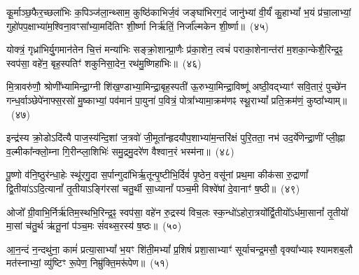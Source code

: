 {\anuvakamend[{वाजं॒ पञ्च॑विꣳशतिः}]}%

कू॒र्माञ्छ॒फैर॒च्छला॑भिः क॒पिञ्ज॑ला॒न्थ्साम॒ कुष्ठि॑काभिर्ज॒वं जङ्घा॑भिरग॒दं जानु॑भ्यां वी॒र्यं॑ कु॒हा\-भ्यां᳚ भ॒यं प्र॑चा॒लाभ्यां॒ गुहो॑पप॒क्षाभ्या॑म॒श्विना॒वꣳसा᳚भ्या॒मदि॑तिꣳ शी॒र्ष्णा निर्\mbox{}ऋ॑तिं॒ निर्जा᳚ल्मकेन शी॒र्ष्णा॥~(४५)\ip

{\anuvakamend[{कू॒र्मान्त्रयो॑विꣳशतिः}]}%

योक्त्रं॒ गृध्रा॑भिर्यु॒गमान॑तेन चि॒त्तं मन्या॑भिः सङ्क्रो॒शान्प्रा॒णैः प्र॑का॒शेन॒ त्वचं॑ पराका॒शेनान्त॑रां म॒शका॒न्केशै॒रिन्द्र॒ꣴ॒ स्वप॑सा॒ वहे॑न॒ बृह॒स्पतिꣳ॑ शकुनिसा॒देन॒ रथ॑मु॒ष्णिहा॑भिः॥~(४६)\ip

{\anuvakamend[{योक्त्र॒मेक॑विꣳशतिः}]}%

मि॒त्रावरु॑णौ॒ श्रोणी᳚भ्यामिन्द्रा॒ग्नी शि॑ख॒ण्डाभ्या॒मिन्द्रा॒बृह॒स्पती॑ ऊ॒रुभ्या॒मिन्द्रा॒विष्णू॑ अष्ठी॒वद्भ्याꣳ॑ सवि॒तारं॒ पुच्छे॑न गन्ध॒र्वाञ्छेपे॑नाफ्स॒रसो॑ मु॒ष्काभ्यां॒ पव॑मानं पा॒युना॑ प॒वित्रं॒ पोत्रा᳚भ्यामा॒क्रम॑णꣴ स्थू॒रा\-भ्यां᳚ प्रति॒क्रम॑णं॒ कुष्ठा᳚भ्याम्॥~(४७)\ip

{\anuvakamend[{}]}%

इन्द्र॑स्य क्रो॒डो\-ऽदि॑त्यै पाज॒स्य॑न्दि॒शां ज॒त्रवो॑ जी॒मूता᳚न्हृदयौप॒शाभ्या॑म॒न्तरि॑क्षं पुरि॒तता॒ नभ॑ उद॒र्ये॑णेन्द्रा॒णीं प्ली॒ह्ना व॒ल्मीका᳚न्क्लो॒म्ना गि॒रीन्प्ला॒शिभिः॑ समु॒द्रमु॒दरे॑ण वैश्वान॒रं भस्म॑ना॥~(४८)\ip

{\anuvakamend[{मि॒त्रावरु॑णा॒विन्द्र॑स्य॒ द्वाविꣳ॑शति॒र्द्वाविꣳ॑शतिः}]}%

पू॒ष्णो व॑नि॒ष्ठुर॑न्धा॒हेः स्थू॑रगु॒दा स॒र्पान्गुदा॑भिर्\mbox{}ऋ॒तून्पृ॒ष्टीभि॒र्दिवं॑ पृ॒ष्ठेन॒ वसू॑नां प्रथ॒मा कीक॑सा रु॒द्राणां᳚ द्वि॒तीया॑\-ऽऽदि॒त्यानां᳚ तृ॒तीया\-ऽङ्गि॑रसां चतु॒र्थी सा॒ध्यानां᳚ पञ्च॒मी विश्वे॑षां दे॒वानाꣳ॑ ष॒ष्ठी॥~(४९)\ip

{\anuvakamend[{पू॒ष्णश्चतु॑र्विꣳशतिः}]}%

ओजो᳚ ग्री॒वाभि॒र्निर्\mbox{}ऋ॑तिम॒स्थभि॒रिन्द्र॒ꣴ॒ स्वप॑सा॒ वहे॑न रु॒द्रस्य॑ विच॒लः स्क॒न्धो॑\-ऽहो\-रा॒त्रयो᳚र्द्वि॒तीयो᳚\-ऽर्ध\-मा॒सानां᳚ तृ॒तीयो॑ मा॒सां च॑तु॒र्थ ऋ॑तू॒नां प॑ञ्च॒मः सं॑वथ्स॒रस्य॑ ष॒ष्ठः॥~(५०)\ip

{\anuvakamend[{ओजो॑ विꣳश॒तिः}]}%

आ॒न॒न्दं न॒न्दथु॑ना॒ कामं॑ प्रत्या॒सा\-भ्यां᳚ भ॒यꣳ शि॑ती॒म\-भ्यां᳚ प्र॒शिषं॑ प्रशा॒साभ्याꣳ॑ सूर्याचन्द्र॒मसौ॒ वृक्या᳚भ्याꣴ श्यामशब॒लौ मत॑स्नाभ्यां॒ व्यु॑ष्टिꣳ रू॒पेण॒ निम्रु॑क्ति॒मरू॑पेण॥~(५१)\ip

{\anuvakamend[{आ॒न॒न्दꣳ षोड॑श}]}%

